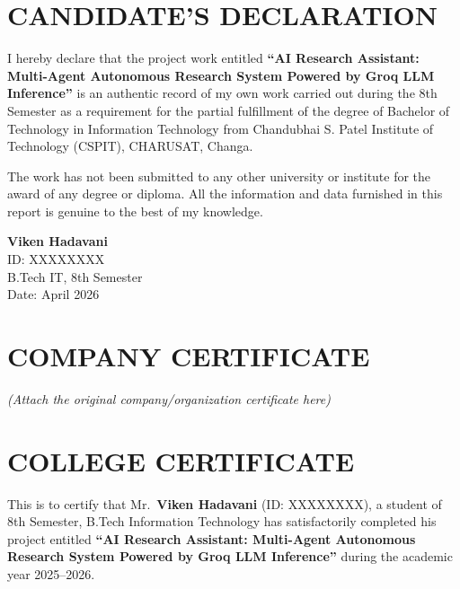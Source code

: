 \documentclass[a4paper,12pt,openany]{report}
\begin{document}
\chapter*{CANDIDATE{'}S DECLARATION}

I hereby declare that the project work entitled \textbf{``AI Research Assistant: Multi-Agent Autonomous Research System Powered by Groq LLM Inference''} is an authentic record of my own work carried out during the 8th Semester as a requirement for the partial fulfillment of the degree of Bachelor of Technology in Information Technology from Chandubhai S. Patel Institute of Technology (CSPIT), CHARUSAT, Changa.

The work has not been submitted to any other university or institute for the award of any degree or diploma. All the information and data furnished in this report is genuine to the best of my knowledge.

\vspace{2cm}
\begin{flushright}
\textbf{Viken Hadavani}\\
ID: XXXXXXXX\\
B.Tech IT, 8th Semester\\
Date: April 2026
\end{flushright}

\chapter*{COMPANY CERTIFICATE}
\begin{center}
\textit{(Attach the original company/organization certificate here)}
\end{center}

\chapter*{COLLEGE CERTIFICATE}

This is to certify that Mr.\ \textbf{Viken Hadavani} (ID: XXXXXXXX), a student of 8th Semester, B.Tech Information Technology has satisfactorily completed his project entitled \textbf{``AI Research Assistant: Multi-Agent Autonomous Research System Powered by Groq LLM Inference''} during the academic year 2025--2026.
\end{document}
